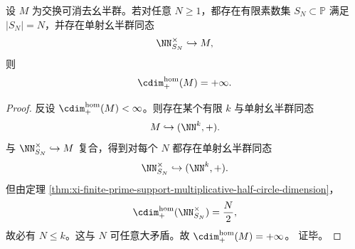 \begin{corollary}[无界独立素数方向迫使结构层同态半圆维发散]\label{cor:xi-unbounded-prime-directions-force-infinite-half-circle-dimension}
设 \(M\) 为交换可消去幺半群。若对任意 \(N\ge 1\)，都存在有限素数集 \(S_N\subset\mathbb P\) 满足 \(|S_N|=N\)，并存在单射幺半群同态
\[
\NN_{S_N}^\times\hookrightarrow M,
\]
则
\[
\cdim^{\mathrm{hom}}_{+}(M)=+\infty.
\]
\end{corollary}
\begin{proof}
反设 \(\cdim^{\mathrm{hom}}_{+}(M)<\infty\)。则存在某个有限 \(k\) 与单射幺半群同态
\[
M\hookrightarrow (\NN^k,+).
\]
与
\(
\NN_{S_N}^\times\hookrightarrow M
\)
复合，得到对每个 \(N\) 都存在单射幺半群同态
\[
\NN_{S_N}^\times\hookrightarrow (\NN^k,+).
\]
但由定理 \ref{thm:xi-finite-prime-support-multiplicative-half-circle-dimension}，
\[
\cdim^{\mathrm{hom}}_{+}(\NN_{S_N}^\times)=\frac{N}{2},
\]
故必有 \(N\le k\)。这与 \(N\) 可任意大矛盾。故
\(
\cdim^{\mathrm{hom}}_{+}(M)=+\infty
\)。
证毕。
\end{proof}
